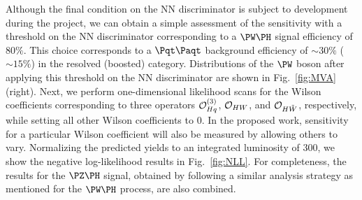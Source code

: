 \documentclass[a4paper,11pt]{article}
\newcommand{\Pt}{{{\Pqt}}\xspace}
\newcommand{\PAt}{{{{\Paqt}}}\xspace}
\begin{document}
Although the final condition on the NN discriminator is subject to development during the project, 
we can obtain a simple assessment of the sensitivity with a threshold on the NN discriminator corresponding to a $\PW\PH$ signal efficiency of $80\%$.
This choice corresponds to a $\Pt\PAt$ background efficiency of $\sim 30\%$ ($\sim 15\%$) in the resolved (boosted) category.
Distributions of the $\PW$ boson \pt after applying this threshold on the NN discriminator are shown in Fig.~\ref{fig:MVA} (right). 
Next, we perform one-dimensional likelihood scans for the Wilson coefficients corresponding to three operators ${\cal O}^{(3)}_{Hq}$, ${\cal O}_{HW}$, and ${\cal O}_{H\tilde{W}}$, respectively, while setting all other Wilson coefficients to $0$. 
In the proposed work, sensitivity for a particular Wilson coefficient will also be measured by allowing others to vary.
Normalizing the predicted yields to an integrated luminosity of 300\fbinv, we show the negative log-likelihood results in Fig.~\ref{fig:NLL}. %
For completeness, the results for the $\PZ\PH$ signal, obtained by following a similar analysis strategy as mentioned for the $\PW\PH$ process, are also combined. 
\end{document}
